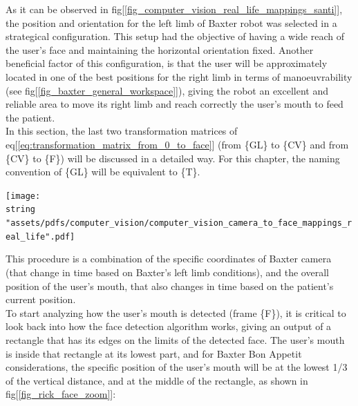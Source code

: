 \documentclass[11pt]{report} %
\begin{document}
As it can be observed in fig[\ref{fig_computer_vision_real_life_mappings_santi}], the position and orientation for the left limb of Baxter robot was selected in a strategical configuration. This setup had the objective of having a wide reach of the user's face and maintaining the horizontal orientation fixed. Another beneficial factor of this configuration, is that the user will be approximately located in one of the best positions for the right limb in terms of manoeuvrability (see fig[\ref{fig_baxter_general_workspace}]), giving the robot an excellent and reliable area to move its right limb and reach correctly the user's mouth to feed the patient.\\ 

In this section, the last two transformation matrices of eq[\ref{eq:transformation_matrix_from_0_to_face}] (from \{GL\} to \{CV\} and from \{CV\} to \{F\}) will be discussed in a detailed way. For this chapter, the naming convention of \{GL\} will be equivalent to \{T\}.\\

\begin{center}
\texttt{[image: \\string "assets/pdfs/computer\_vision/computer\_vision\_camera\_to\_face\_mappings\_real\_life".pdf]}
\bigbreak
\begin{minipage}{\linewidth} %
\label{fig_computer_vision_real_life_mappings_santi}
\end{minipage} \end{center}


This procedure is a combination of the specific coordinates of Baxter camera (that change in time based on Baxter's left limb conditions), and the overall position of the user's mouth, that also changes in time based on the patient's current position.\\

To start analyzing how the user's mouth is detected (frame \{F\}), it is critical to look back into how the face detection algorithm works, giving an output of a rectangle that has its edges on the limits of the detected face.
The user's mouth is inside that rectangle at its lowest part, and for Baxter Bon Appetit considerations, the specific position of the user's mouth will be at the lowest 1/3 of the vertical distance, and at the middle of the rectangle, as shown in fig[\ref{fig_rick_face_zoom}]:
\end{document}
